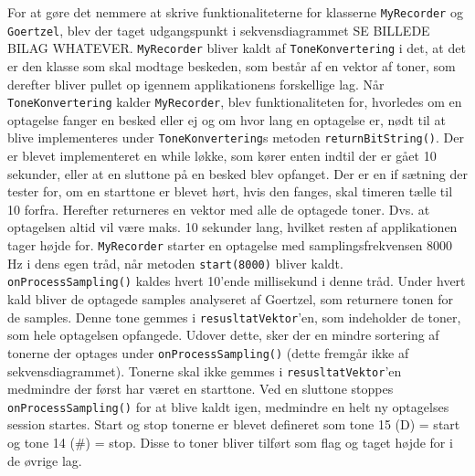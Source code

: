 For at gøre det nemmere at skrive funktionaliteterne for klasserne \texttt{MyRecorder} og \texttt{Goertzel}, blev der taget udgangspunkt i sekvensdiagrammet SE BILLEDE BILAG WHATEVER. 
\newline
\texttt{MyRecorder} bliver kaldt af \texttt{ToneKonvertering} i det, at det er den klasse som skal modtage beskeden, som består af en vektor af toner, som derefter bliver pullet op igennem applikationens forskellige lag.
\newline
Når \texttt{ToneKonvertering} kalder \texttt{MyRecorder}, blev funktionaliteten for, hvorledes om en optagelse fanger en besked eller ej og om hvor lang en optagelse er, nødt til at blive implementeres under \texttt{ToneKonvertering}s metoden \texttt{returnBitString()}.
\newline
Der er blevet implementeret en while løkke, som kører enten indtil der er gået 10 sekunder, eller at en sluttone på en besked blev opfanget. Der er en if sætning der tester for, om en starttone er blevet hørt, hvis den fanges, skal timeren tælle til 10 forfra. Herefter returneres en vektor med alle de optagede toner. Dvs. at optagelsen altid vil være maks. 10 sekunder lang, hvilket resten af applikationen tager højde for.
\newline
\texttt{MyRecorder} starter en optagelse med samplingsfrekvensen 8000 Hz i dens egen tråd, når metoden \texttt{start(8000)} bliver kaldt. \texttt{onProcessSampling()} kaldes hvert 10’ende millisekund i denne tråd. Under hvert kald bliver de optagede samples analyseret af Goertzel, som returnere tonen for de samples. Denne tone gemmes i \texttt{resusltatVektor}’en, som indeholder de toner, som hele optagelsen opfangede. Udover dette, sker der en mindre sortering af tonerne der optages under \texttt{onProcessSampling()} (dette fremgår ikke af sekvensdiagrammet). Tonerne skal ikke gemmes i \texttt{resusltatVektor}’en medmindre der først har været en starttone. Ved en sluttone stoppes \texttt{onProcessSampling()} for at blive kaldt igen, medmindre en helt ny optagelses session startes. Start og stop tonerne er blevet  defineret som tone 15 (D) = start og tone 14 (\#) = stop. Disse to toner bliver tilført som flag og taget højde for i de øvrige lag.

